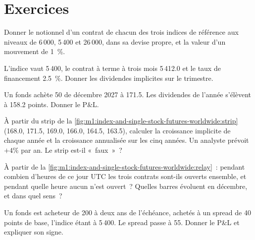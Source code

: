 \section{Exercices}

\begin{exercise}[$\star$]\label{exo:m1:index-and-single-stock-futures-worldwide:1}
Donner le notionnel d'un contrat de chacun des trois indices de référence aux niveaux
de 6\,000, 5\,400 et 26\,000, dans sa devise propre, et la valeur d'un mouvement
de 1~\%.
\end{exercise}

\begin{exercise}[$\star$]\label{exo:m1:index-and-single-stock-futures-worldwide:2}
L'indice vaut 5\,400, le contrat à terme à trois mois 5\,412.0 et le taux de financement
2.5~\%. Donner les dividendes implicites sur le trimestre.
\end{exercise}

\begin{exercise}[$\star$]\label{exo:m1:index-and-single-stock-futures-worldwide:3}
Un fonds achète 50  de décembre 2027 à 171.5. Les
dividendes de l'année s'élèvent à 158.2 points. Donner le P\&L.
\end{exercise}

\begin{exercise}[$\star\star$]\label{exo:m1:index-and-single-stock-futures-worldwide:4}
À partir du strip de la \cref{fig:m1:index-and-single-stock-futures-worldwide:strip}
(168.0, 171.5, 169.0, 166.0, 164.5, 163.5), calculer la croissance implicite de chaque année
et la croissance annualisée sur les cinq années. Un analyste prévoit $+4\%$ par
an. Le strip est-il «~faux~»~?
\end{exercise}

\begin{exercise}[$\star\star$]\label{exo:m1:index-and-single-stock-futures-worldwide:5}
À partir de la \cref{fig:m1:index-and-single-stock-futures-worldwide:relay}~: pendant combien
d'heures de ce jour UTC les trois contrats sont-ils ouverts ensemble, et pendant quelle
heure aucun n'est ouvert~? Quelles barres évoluent en décembre, et dans quel sens~?
\end{exercise}

\begin{exercise}[$\star\star$]\label{exo:m1:index-and-single-stock-futures-worldwide:6}
Un fonds est acheteur de 200  à deux ans de l'échéance, achetés
à un spread de 40 points de base, l'indice étant à 5\,400. Le spread passe à 55.
Donner le P\&L et expliquer son signe.
\end{exercise}

